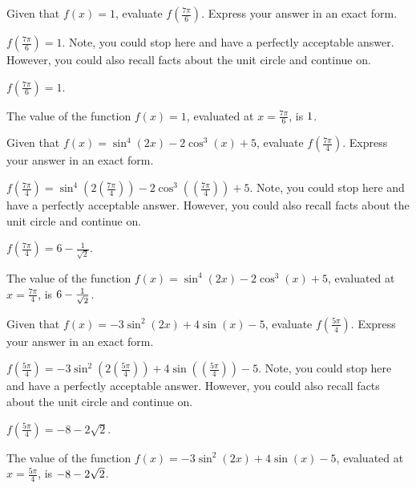 \begin{shuffle}
\begin{exercise}
Given that $f(x)=1$, evaluate $f(\frac{7 \pi }{6})$. Express your answer in an exact form.
\begin{solution}
\begin{hint}
$f(\frac{7 \pi }{6})=1$. Note, you could stop here and have a perfectly acceptable answer. However, you could also recall facts about the unit circle and continue on. 
\end{hint}
\begin{hint}
$f(\frac{7 \pi }{6})=1$.
\end{hint}
The value of the function $f(x) = 1$, evaluated at $x=\frac{7 \pi }{6}$, is ${1}$.
\end{solution}
\end{exercise}

\begin{exercise}
Given that $f(x)=\sin ^4(2 x)-2 \cos ^3(x)+5$, evaluate $f(\frac{7 \pi }{4})$. Express your answer in an exact form.
\begin{solution}
\begin{hint}
$f(\frac{7 \pi }{4})=\sin ^4(2 (\frac{7 \pi }{4}))-2 \cos ^3((\frac{7 \pi }{4}))+5$. Note, you could stop here and have a perfectly acceptable answer. However, you could also recall facts about the unit circle and continue on. 
\end{hint}
\begin{hint}
$f(\frac{7 \pi }{4})=6-\frac{1}{\sqrt{2}}$.
\end{hint}
The value of the function $f(x) = \sin ^4(2 x)-2 \cos ^3(x)+5$, evaluated at $x=\frac{7 \pi }{4}$, is ${6-\frac{1}{\sqrt{2}}}$.
\end{solution}
\end{exercise}

\begin{exercise}
Given that $f(x)=-3 \sin ^2(2 x)+4 \sin (x)-5$, evaluate $f(\frac{5 \pi }{4})$. Express your answer in an exact form.
\begin{solution}
\begin{hint}
$f(\frac{5 \pi }{4})=-3 \sin ^2(2 (\frac{5 \pi }{4}))+4 \sin ((\frac{5 \pi }{4}))-5$. Note, you could stop here and have a perfectly acceptable answer. However, you could also recall facts about the unit circle and continue on. 
\end{hint}
\begin{hint}
$f(\frac{5 \pi }{4})=-8-2 \sqrt{2}$.
\end{hint}
The value of the function $f(x) = -3 \sin ^2(2 x)+4 \sin (x)-5$, evaluated at $x=\frac{5 \pi }{4}$, is ${-8-2 \sqrt{2}}$.
\end{solution}
\end{exercise}


\end{shuffle}
